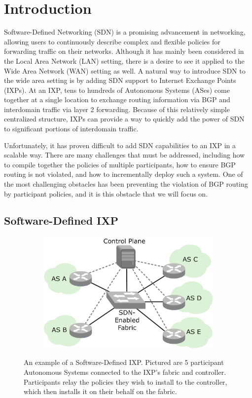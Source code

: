 \section{Introduction}
Software-Defined Networking (SDN) is a promising advancement in networking, allowing users to continuously describe complex and flexible policies for forwarding traffic on their networks. Although it has mainly been considered in the Local Area Network (LAN) setting, there is a desire to see it applied to the Wide Area Network (WAN) setting as well. 
A natural way to introduce SDN to the wide area setting is by adding SDN support to Internet Exchange Points (IXPs). At an IXP, tens to hundreds of Autonomous Systems (ASes) come together at a single location to exchange routing information via BGP and interdomain traffic via layer 2 forwarding. Because of this relatively simple centralized structure, IXPs can provide a way to quickly add the power of SDN to significant portions of interdomain traffic. 

Unfortunately, it has proven difficult to add SDN capabilities to an IXP in a scalable way. There are many challenges that must be addressed, including how to compile together the policies of multiple participants, how to ensure BGP routing is not violated, and how to incrementally deploy such a system. One of the most challenging obstacles has been preventing the violation of BGP routing by participant policies, and it is this obstacle that we will focus on. 


\subsection{Software-Defined IXP}

\begin{figure}[t!] 
\begin{minipage}{1\linewidth}
\begin{subfigure}[b]{0.96\linewidth}
\includegraphics[width=\linewidth]{figures/sdx_example1}
\end{subfigure} 
\end{minipage} 
\caption{An example of a Software-Defined IXP. Pictured are 5 participant Autonomous Systems connected to the IXP's fabric and controller. Participants relay the policies they wish to install to the controller, which then installs it on their behalf on the fabric.}
\label{fig:sdx}
\end{figure}

